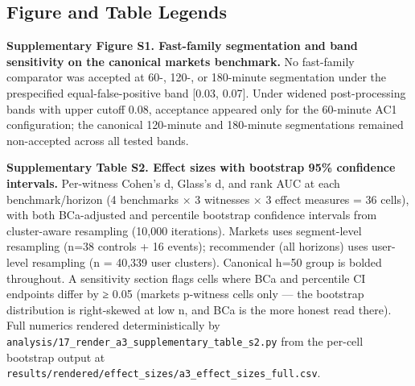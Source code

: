 \documentclass[
  11pt,
]{article}
\begin{document}
\subsection{Figure and Table Legends}\label{figure-and-table-legends}

\textbf{Supplementary Figure S1. Fast-family segmentation and band
sensitivity on the canonical markets benchmark.} No fast-family
comparator was accepted at 60-, 120-, or 180-minute segmentation under
the prespecified equal-false-positive band {[}0.03, 0.07{]}. Under
widened post-processing bands with upper cutoff 0.08, acceptance
appeared only for the 60-minute AC1 configuration; the canonical
120-minute and 180-minute segmentations remained non-accepted across all
tested bands.

\textbf{Supplementary Table S2. Effect sizes with bootstrap 95\%
confidence intervals.} Per-witness Cohen's d, Glass's d, and rank AUC at
each benchmark/horizon (4 benchmarks × 3 witnesses × 3 effect measures =
36 cells), with both BCa-adjusted and percentile bootstrap confidence
intervals from cluster-aware resampling (10,000 iterations). Markets
uses segment-level resampling (n=38 controls + 16 events); recommender
(all horizons) uses user-level resampling (n = 40,339 user clusters).
Canonical h=50 group is bolded throughout. A sensitivity section flags
cells where BCa and percentile CI endpoints differ by ≥ 0.05 (markets
p-witness cells only --- the bootstrap distribution is right-skewed at
low n, and BCa is the more honest read there). Full numerics rendered
deterministically by
\texttt{analysis/17\_render\_a3\_supplementary\_table\_s2.py} from the
per-cell bootstrap output at
\texttt{results/rendered/effect\_sizes/a3\_effect\_sizes\_full.csv}.
\end{document}
